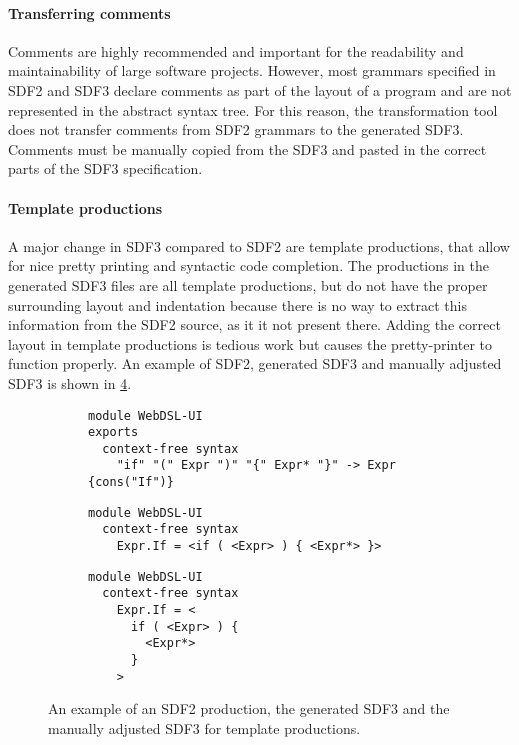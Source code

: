       \paragraph{Transferring comments} Comments are highly recommended and important for the readability and maintainability of large software projects. However, most grammars specified in SDF2 and SDF3 declare comments as part of the layout of a program and are not represented in the abstract syntax tree. For this reason, the transformation tool does not transfer comments from SDF2 grammars to the generated SDF3. Comments must be manually copied from the SDF3 and pasted in the correct parts of the SDF3 specification.

      \paragraph{Template productions} A major change in SDF3 compared to SDF2 are template productions, that allow for nice pretty printing and syntactic code completion. The productions in the generated SDF3 files are all template productions, but do not have the proper surrounding layout and indentation because there is no way to extract this information from the SDF2 source, as it it not present there. Adding the correct layout in template productions is tedious work but causes the pretty-printer to function properly. An example of SDF2, generated SDF3 and manually adjusted SDF3 is shown in \cref{fig:sdf2-sdf3-template-production}.

      \begin{figure}
        \begin{subfigure}[b]{1\textwidth}
          \begin{verbatim}
module WebDSL-UI
exports
  context-free syntax
    "if" "(" Expr ")" "{" Expr* "}" -> Expr {cons("If")}
          \end{verbatim}
          \caption{\label{fig:sdf2-sdf3-template-production-sdf2}}
        \end{subfigure}
        \begin{subfigure}[b]{0.6\textwidth}
          \begin{verbatim}
module WebDSL-UI
  context-free syntax
    Expr.If = <if ( <Expr> ) { <Expr*> }>
          \end{verbatim}
          \caption{\label{fig:sdf2-sdf3-template-production-sdf3-gen}}
        \end{subfigure}
        \begin{subfigure}[b]{0.4\textwidth}
          \begin{verbatim}
module WebDSL-UI
  context-free syntax
    Expr.If = <
      if ( <Expr> ) {
        <Expr*> 
      }
    >
          \end{verbatim}
          \caption{\label{fig:sdf2-sdf3-template-production-sdf3-adjusted}}
        \end{subfigure}
        \caption{\label{fig:sdf2-sdf3-template-production}An example of an SDF2 production, the generated SDF3 and the manually adjusted SDF3 for template productions.}
      \end{figure}

